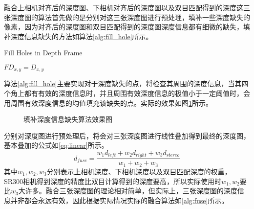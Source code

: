 融合上相机对齐后的深度图、下相机对齐后的深度图以及双目匹配得到的深度这三张深度图的算法首先做的是分别对这三张深度图进行预处理，填补一些深度缺失的像素，因为对齐后的深度图和双目匹配得到的深度图深度信息都有细微的缺失，填补深度信息缺失的方法如算法\ref{alg:fill_hole}所示。
\begin{algorithm}[!ht]
  \caption{Fill Holes in Depth Frame}
  \label{alg:fill_hole}
   {
     {
       {
        $FD_{x,y} = D_{x,y}$\;
      } 
    }
  }
\end{algorithm}
算法\ref{alg:fill_hole}主要实现对于深度缺失的点，将检查其周围的深度信息，当其四个角上都有有效的深度信息时，并且周围有效深度信息的极值小于一定阈值时，会用周围有效深度信息的均值填充该缺失的点。实际的效果如图\ref{fig:fill_hole}所示。
\begin{figure}[!ht]
  \centering
    \hskip1.5cm
  \caption{填补深度信息缺失算法效果图}
  \label{fig:fill_hole}
\end{figure}
分别对深度图进行预处理后，将会对三张深度图进行线性叠加得到最终的深度图，基本叠加的公式如\ref{eq:linear}所示。
\begin{equation}
  \label{eq:linear}
  d_{fuse} = \frac{w_1d_{left} + w_2d_{right}+w_3d_{stereo}}{w_1+w_2+w_3}
\end{equation}
其中$w_1,w_2,w_3$分别表示上相机深度、下相机深度以及双目匹配深度的权重，SR300相机得到深度的精度比双目计算得到的深度要高，所以实际使用时$w_1,w_2$要比$w_3$大许多。融合三张深度图的理论相对简单，但实际上，三张深度图的深度信息并非都会永远有效，因此根据实际情况实际的融合算法如\ref{alg:fuse}所示。
